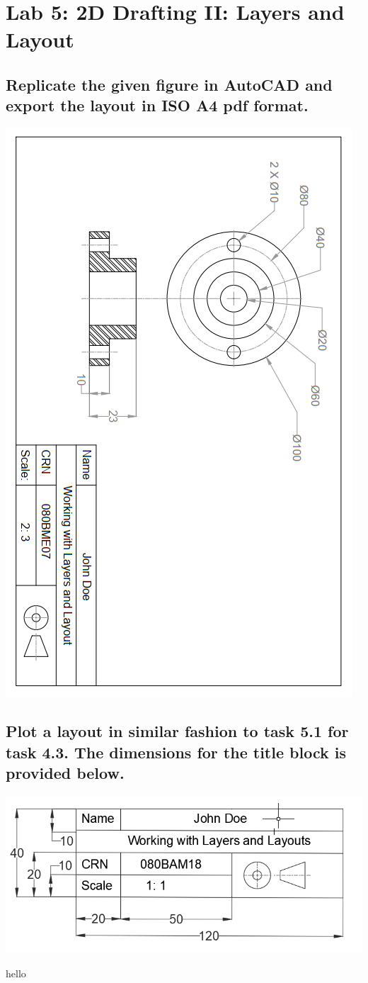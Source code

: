 \documentclass[a4paper, 12pt]{article}
\begin{document}
\section{Lab 5: 2D Drafting II: Layers and Layout}
\subsection{Replicate the given figure in AutoCAD and export the layout in ISO A4 pdf format.}
\begin{center}
	\includegraphics[scale = 0.8]{gfx/l5t1.PNG}
\end{center}
\subsection{Plot a layout in similar fashion to task 5.1 for task 4.3. The dimensions for the  title block is provided below.}
\begin{center}
	\includegraphics[scale = 0.7]{gfx/l5t2.PNG}
\end{center}
hello
\end{document}
